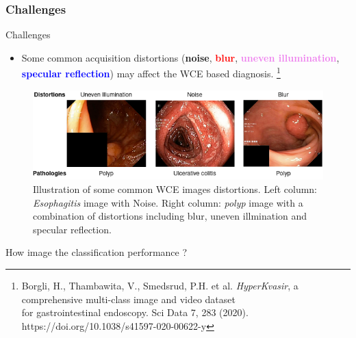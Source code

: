 \documentclass{libs/ufc_format}
\begin{document}
\subsubsection{Challenges}
\begin{frame}{Challenges}
    \begin{itemize}
        \item Some common acquisition distortions (\textbf{noise}, \textcolor{red}{\textbf{blur}}, \textcolor{violet}{\textbf{uneven illumination}}, \textcolor{blue}{\textbf{specular reflection}}) may affect the WCE based diagnosis.         \footnote[frame]{\tiny Borgli, H., Thambawita, V., Smedsrud, P.H. et al. \textit{HyperKvasir}, a comprehensive multi-class image and video dataset \\for gastrointestinal endoscopy. Sci Data 7, 283 (2020). https://doi.org/10.1038/s41597-020-00622-y}
    \end{itemize}


    \begin{figure}
        \centering
        \includegraphics[scale=0.02]{libs/examdis3.png}
        \caption{Illustration of some common WCE images distortions. Left column: \textit{Esophagitis} image with Noise. Right column: \textit{polyp} image with a combination of distortions including blur, uneven illmination and specular reflection.}
        \label{fig:endoscopy}
    \end{figure}

\end{frame}

\begin{frame}
    \large How image  the classification performance ?
\end{frame}
\end{document}
